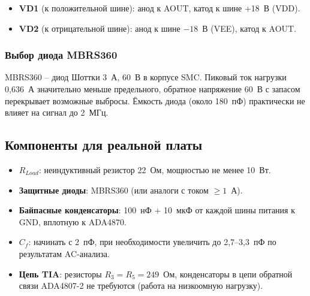 \documentclass[a4paper, 12pt]{article}
\begin{document}
\begin{itemize}
  \item \textbf{VD1} (к положительной шине): анод к AOUT,
        катод к шине +18~В (VDD).
  \item \textbf{VD2} (к отрицательной шине): анод к шине $-18$~В
        (VEE), катод к AOUT.
\end{itemize}

\subsubsection{Выбор диода MBRS360}
MBRS360 \cite{MBRS360_ds} – диод Шоттки 3~А, 60~В в корпусе SMC.
Пиковый ток нагрузки 0{,}636~А значительно меньше предельного,
обратное напряжение 60~В с запасом перекрывает возможные выбросы.
Ёмкость диода (около 180~пФ) практически не влияет на сигнал
до 2~МГц.

\subsection{Компоненты для реальной платы}

\begin{itemize}
  \item \textbf{\(R_{Load}\)}: неиндуктивный резистор 22~Ом,
        мощностью не менее 10~Вт.
  \item \textbf{Защитные диоды}: MBRS360 (или аналоги с током \(\ge 1\)~А).
  \item \textbf{Байпасные конденсаторы}: 100~нФ + 10~мкФ
        от каждой шины питания к GND, вплотную к ADA4870.
  \item \textbf{\(C_f\)}: начинать с 2~пФ, при необходимости
        увеличить до 2{,}7--3{,}3~пФ по результатам AC-анализа.
  \item \textbf{Цепь TIA}: резисторы \(R_3=R_5=249\)~Ом,
        конденсаторы в цепи обратной связи ADA4807-2 не требуются
        (работа на низкоомную нагрузку).
\end{itemize}
\end{document}
